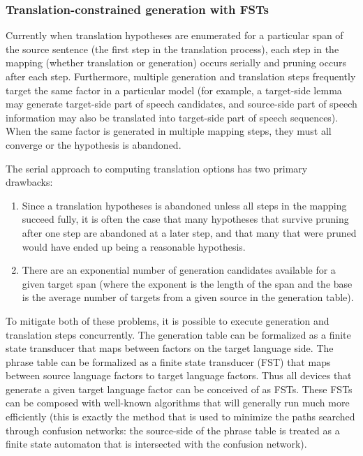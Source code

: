 \documentclass[11pt]{report}
\theoremstyle{plain}
\begin{document}
\subsubsection{Translation-constrained generation with FSTs}

Currently when translation hypotheses are enumerated for a
particular span of the source sentence (the first step in the
translation process), each step in the mapping (whether translation
or generation) occurs serially and pruning occurs after each step.
Furthermore, multiple generation and translation steps frequently
target the same factor in a particular model (for example, a
target-side lemma may generate target-side part of speech
candidates, and source-side part of speech information may also be
translated into target-side part of speech sequences).  When the
same factor is generated in multiple mapping steps, they must all
converge or the hypothesis is abandoned.

The serial approach to computing translation options has two primary
drawbacks:

\begin{enumerate}
  \item Since a translation hypotheses is abandoned unless all steps in the
mapping succeed fully, it is often the case that many hypotheses
that survive pruning after one step are abandoned at a later step,
and that many that were pruned would have ended up being a
reasonable hypothesis.
  \item There are an exponential number of generation candidates available
for a given target span (where the exponent is the length of the
span and the base is the average number of targets from a given
source in the generation table).
\end{enumerate}

To mitigate both of these problems, it is possible to execute
generation and translation steps concurrently.  The generation table
can be formalized as a finite state transducer that maps between
factors on the target language side. The phrase table can be
formalized as a finite state transducer (FST) that maps between
source language factors to target language factors.  Thus all
devices that generate a given target language factor can be
conceived of as FSTs.  These FSTs can be composed with well-known
algorithms that will generally run much more efficiently (this is
exactly the method that is used to minimize the paths searched
through confusion networks: the source-side of the phrase table is
treated as a finite state automaton that is intersected with the
confusion network).
\end{document}
